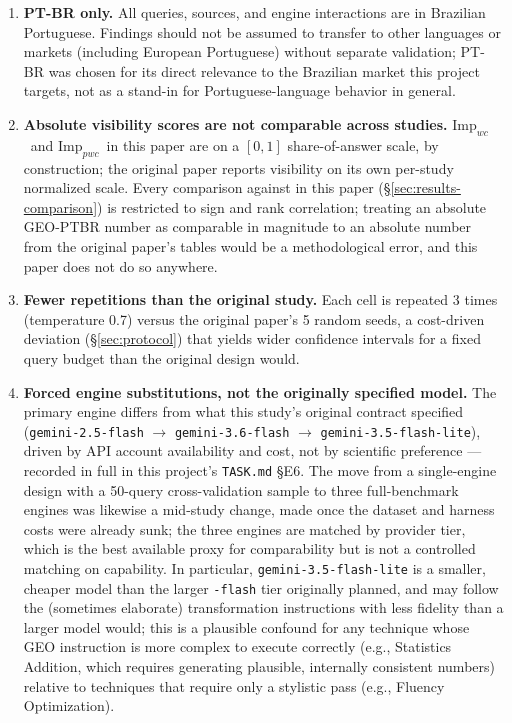 \documentclass[11pt,a4paper]{article}
\newcommand{\Impwc}{\ensuremath{\mathrm{Imp}_{wc}}}
\newcommand{\Imppwc}{\ensuremath{\mathrm{Imp}_{pwc}}}
\begin{document}
\begin{enumerate}[leftmargin=*]
\item \textbf{PT-BR only.} All queries, sources, and engine interactions
  are in Brazilian Portuguese. Findings should not be assumed to transfer
  to other languages or markets (including European Portuguese) without
  separate validation; PT-BR was chosen for its direct relevance to the
  Brazilian market this project targets, not as a stand-in for
  Portuguese-language behavior in general.

\item \textbf{Absolute visibility scores are not comparable across
  studies.} \Impwc\ and \Imppwc\ in this paper are on a $[0,1]$
  share-of-answer scale, by construction; the original paper reports
  visibility on its own per-study normalized scale. Every comparison
  against \citet{aggarwal2024geo} in this paper (\S\ref{sec:results-comparison})
  is restricted to sign and rank correlation; treating an absolute GEO-PTBR
  number as comparable in magnitude to an absolute number from the original
  paper's tables would be a methodological error, and this paper does not
  do so anywhere.

\item \textbf{Fewer repetitions than the original study.} Each cell is
  repeated 3 times (temperature 0.7) versus the original paper's 5 random
  seeds, a cost-driven deviation (\S\ref{sec:protocol}) that yields wider
  confidence intervals for a fixed query budget than the original design
  would.

\item \textbf{Forced engine substitutions, not the originally specified
  model.} The primary engine differs from what this study's original
  contract specified (\texttt{gemini-2.5-flash} $\to$
  \texttt{gemini-3.6-flash} $\to$ \texttt{gemini-3.5-flash-lite}), driven
  by API account availability and cost, not by scientific preference ---
  recorded in full in this project's \texttt{TASK.md} \S E6. The move from
  a single-engine design with a 50-query cross-validation sample to three
  full-benchmark engines was likewise a mid-study change, made once the
  dataset and harness costs were already sunk; the three engines are
  matched by provider tier, which is the best available proxy for
  comparability but is not a controlled matching on capability. In particular, \texttt{gemini-3.5-flash-lite} is a
  smaller, cheaper model than the larger \texttt{-flash} tier originally
  planned, and may follow the (sometimes elaborate) transformation
  instructions with less fidelity than a larger model would; this is a
  plausible confound for any technique whose GEO instruction is more
  complex to execute correctly (e.g., Statistics Addition, which requires
  generating plausible, internally consistent numbers) relative to
  techniques that require only a stylistic pass (e.g., Fluency
  Optimization).


\end{enumerate}
\end{document}
